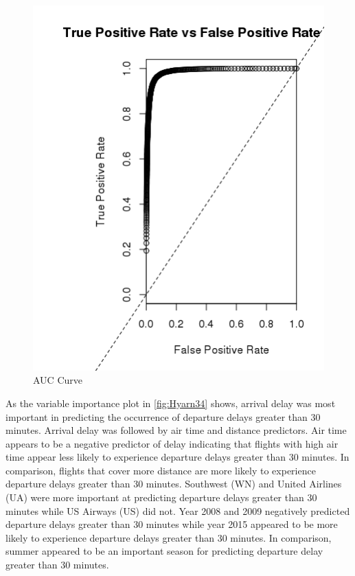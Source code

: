 \documentclass[12pt,twoside]{amherstthesis}
\begin{document}
  \begin{figure}[htbp]
  \centering
  \includegraphics[scale = 0.8,angle = 0]{figure/ROCCurveLog-3.png}
  \caption[AUC Curve]{\normalsize{AUC Curve}}
  \label{fig:Hyarn48}
  \end{figure}
  
  \clearpage
  
  As the variable importance plot in \autoref{fig:Hyarn34} shows, arrival
  delay was most important in predicting the occurrence of departure
  delays greater than 30 minutes. Arrival delay was followed by air time
  and distance predictors. Air time appears to be a negative predictor of
  delay indicating that flights with high air time appear less likely to
  experience departure delays greater than 30 minutes. In comparison,
  flights that cover more distance are more likely to experience departure
  delays greater than 30 minutes. Southwest (WN) and United Airlines (UA)
  were more important at predicting departure delays greater than 30
  minutes while US Airways (US) did not. Year 2008 and 2009 negatively
  predicted departure delays greater than 30 minutes while year 2015
  appeared to be more likely to experience departure delays greater than
  30 minutes. In comparison, summer appeared to be an important season for
  predicting departure delay greater than 30 minutes.
  
\end{document}

